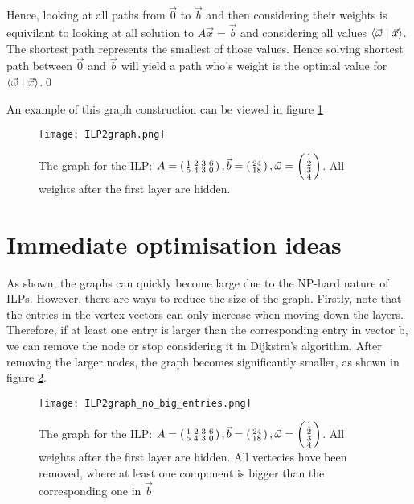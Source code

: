 Hence, looking at all paths from $\vec 0$ to $\vec b$ and then considering their weights is equivilant to looking at all solution to $A\vec x = \vec b$ and considering all values $\langle \vec\omega \mid \vec x \rangle$. The shortest path represents the smallest of those values. Hence solving shortest path between $\vec 0$ and $\vec b$ will yield a path who's weight is the optimal value for $\langle \vec\omega \mid \vec x \rangle$.\qed

An example of this graph construction can be viewed in figure \ref{fig:ILP2graph_no_optimisation}
\begin{figure}
    \texttt{[image: ILP2graph.png]}
    \caption{\label{fig:ILP2graph_no_optimisation}The graph for the ILP: $A = \left(\begin{smallmatrix}1&2&3&6\\5&4&3&0\end{smallmatrix}\right), \vec b = \left(\begin{smallmatrix}24\\18\end{smallmatrix}\right), \vec \omega = \left(\begin{smallmatrix}1\\2\\3\\4\end{smallmatrix}\right)$. All weights after the first layer are hidden.}
\end{figure}

\section{Immediate optimisation ideas}
\label{chap:graph_optimisation}
As shown, the graphs can quickly become large due to the NP-hard nature of ILPs. However, there are ways to reduce the size of the graph. Firstly, note that the entries in the vertex vectors can only increase when moving down the layers. Therefore, if at least one entry is larger than the corresponding entry in vector b, we can remove the node or stop considering it in Dijkstra's algorithm. After removing the larger nodes, the graph becomes significantly smaller, as shown in figure \ref{fig:ILP2graph_no_big_entries}.

\begin{figure}
    \texttt{[image: ILP2graph\_no\_big\_entries.png]}
    \caption{\label{fig:ILP2graph_no_big_entries}The graph for the ILP: $A = \left(\begin{smallmatrix}1&2&3&6\\5&4&3&0\end{smallmatrix}\right), \vec b = \left(\begin{smallmatrix}24\\18\end{smallmatrix}\right), \vec \omega = \left(\begin{smallmatrix}1\\2\\3\\4\end{smallmatrix}\right)$. All weights after the first layer are hidden. All vertecies have been removed, where at least one component is bigger than the corresponding one in $\vec b$}
\end{figure}

